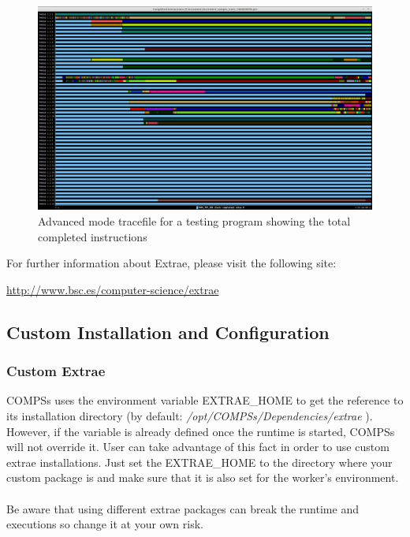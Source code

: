 \begin{landscape}
\begin{figure}[ht!]
  \centering
    \includegraphics[width=\linewidth]{./Sections/2_Execution/Figures/advanced.png}
    \caption{Advanced mode tracefile for a testing program showing the total completed instructions}
    \label{fig:advanced_trace}
\end{figure}
\end{landscape}

For further information about Extrae, please visit the following site: 
\begin{center}
\url{http://www.bsc.es/computer-science/extrae} 
\end{center}


\subsection{Custom Installation and Configuration}


\subsubsection{Custom Extrae}

COMPSs uses the environment variable EXTRAE\_HOME to get the reference to its installation directory (by default: \textit{/opt/COMPSs/Dependencies/extrae} ). However, if the variable is already defined once the runtime is started, COMPSs will not override it. User can take advantage of this fact in order to use custom extrae installations. Just set the EXTRAE\_HOME to the directory where your custom package is and make sure that it is also set for the worker's environment. 
\\
\\
Be aware that using different extrae packages can break the runtime and executions so change it at your own risk.

